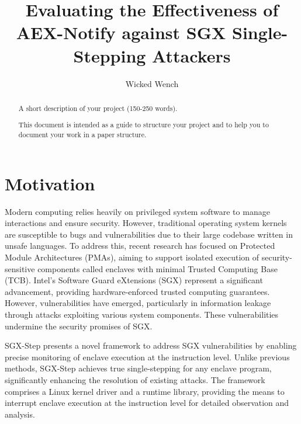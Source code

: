 \documentclass{llncs}
\title{Evaluating the Effectiveness of AEX-Notify against SGX Single-Stepping Attackers}
\author{Wicked Wench}
\institute{	University of L\"ubeck, Germany}
\begin{document}
\maketitle

\begin{abstract}
A short description of your project (150-250 words).

This document is intended as a guide to structure your project and to help you
to document your work in a paper structure.
\end{abstract}


\section{Motivation}


Modern computing relies heavily on privileged system software to manage
interactions and ensure security. However, traditional operating system kernels
are susceptible to bugs and vulnerabilities due to their large codebase written
in unsafe languages. To address this, recent research has focused on Protected
Module Architectures (PMAs), aiming to support isolated execution of
security-sensitive components called enclaves with minimal Trusted Computing
Base (TCB). Intel’s Software Guard eXtensions (SGX)
\cite{Intel16,Intel17} represent a significant advancement, providing
hardware-enforced trusted computing guarantees. However, vulnerabilities have
emerged, particularly in information leakage through attacks exploiting various
system components. These vulnerabilities undermine the security promises of
SGX.

SGX-Step presents a novel framework to address SGX vulnerabilities by enabling
precise monitoring of enclave execution at the instruction level. Unlike
previous methods, SGX-Step achieves true single-stepping for any enclave
program, significantly enhancing the resolution of existing attacks. The
framework comprises a Linux kernel driver and a runtime library, providing the
means to interrupt enclave execution at the instruction level for detailed
observation and analysis.
\end{document}
